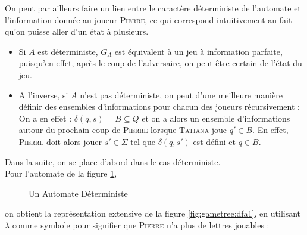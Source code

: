 \documentclass{cours}
\begin{document}
On peut par ailleurs faire un lien entre le caractère déterministe de l'automate et l'information donnée au joueur \textsc{Pierre}, ce qui correspond intuitivement au fait qu'on puisse aller d'un état à plusieurs.
\begin{itemize}
    \item Si $A$ est déterministe, $G_{A}$ est équivalent à un jeu à information parfaite, puisqu'en effet, après le coup de l'adversaire, on peut être certain de l'état du jeu.
    \item A l'inverse, si $A$ n'est pas déterministe, on peut d'une meilleure manière définir des ensembles d'informations pour chacun des joueurs récursivement : On a en effet : $\delta(q, s) = B \subseteq Q$ et on a alors un ensemble d'informations autour du prochain coup de \textsc{Pierre} lorsque \textsc{Tatiana} joue $q' \in B$. En effet, \textsc{Pierre} doit alors jouer $s' \in \Sigma$ tel que $\delta(q, s')$ est défini et $q \in B$.
\end{itemize}
Dans la suite, on se place d'abord dans le cas déterministe.\\
Pour l'automate de la figure \ref{fig:dfa1}, 
\begin{figure}
    \centering
    \caption{Un Automate Déterministe}
    \label{fig:dfa1}
\end{figure}
on obtient la représentation extensive de la figure \ref{fig:gametree:dfa1}, en utilisant $\lambda$ comme symbole pour signifier que \textsc{Pierre} n'a plus de lettres jouables :
\end{document}
